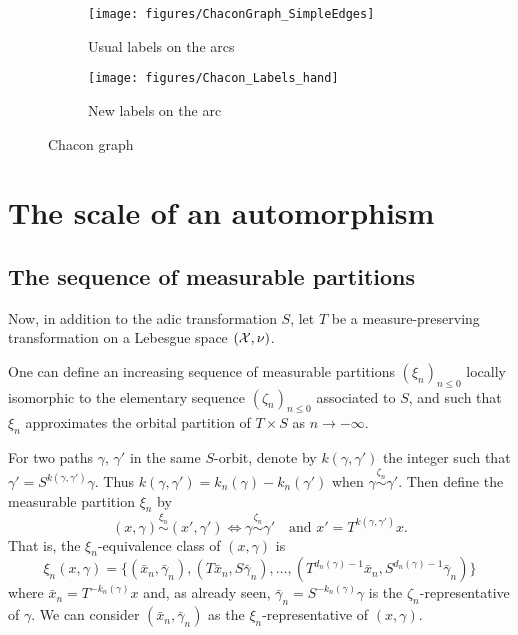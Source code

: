 \documentclass[12pt,a4paper]{article}
\begin{document}
\begin{figure}[!h]
   \centering
   \begin{subfigure}[t]{0.47\textwidth}
   \centering
   	\texttt{[image: figures/ChaconGraph\_SimpleEdges]}
 		\caption{\footnotesize Usual labels on the arcs}\label{fig:ChaconGraph_simpleedges}
    \end{subfigure}              
   \quad
    \begin{subfigure}[t]{0.47\textwidth}
    \centering
   	\texttt{[image: figures/Chacon\_Labels\_hand]}
 		\caption{\footnotesize New labels on the arc}\label{fig:ChaconGraph_newlabs}
 	\end{subfigure}      

   \caption{Chacon graph}
   \label{fig:ChaconGraph}
 \end{figure}



\section{The scale of an automorphism}

\subsection{The sequence of measurable partitions}

Now, in addition to the adic transformation $S$, let $T$ be a measure-preserving transformation on a Lebesgue space $(\mathcal{X}, \nu)$. 

One can define an increasing sequence of measurable partitions ${(\xi_n)}_{n \leq 0}$ 
locally isomorphic to the elementary sequence ${(\zeta_n)}_{n \leq 0}$ associated to $S$,  
and such that $\xi_n$ approximates the orbital partition of $T \times S$ as 
$n \to -\infty$.

For two paths $\gamma$, $\gamma'$ in the same $S$-orbit, denote by $k(\gamma,\gamma')$ 
the integer such that $\gamma'=S^{k(\gamma,\gamma')}\gamma$. 
Thus $k(\gamma,\gamma') = k_n(\gamma)-k_n(\gamma')$ when $\gamma \overset{\zeta_n}{\sim} \gamma'$. 
Then define the measurable partition $\xi_n$ by 
$$
\boxed{(x, \gamma) \overset{\xi_n}{\sim} (x', \gamma') \iff 
\gamma \overset{\zeta_n}{\sim} \gamma' \quad 
\text{and $x'=T^{k(\gamma,\gamma')}x$}}. 
$$
That is, the $\xi_n$-equivalence class of $(x,\gamma)$ is 
$$
\boxed{\xi_n(x,\gamma) = \bigl\{(\bar x_n, \bar\gamma_n), (T\bar x_n, S\bar\gamma_n), 
\ldots, (T^{d_n(\gamma)-1}\bar x_n, S^{d_n(\gamma)-1}\bar\gamma_n) \bigr\}}
$$
where $\bar x_n = T^{-k_n(\gamma)}x$ and, as already seen, 
$\bar\gamma_n = S^{-k_n(\gamma)}\gamma$ is the $\zeta_n$-representative of 
$\gamma$. 
We can consider $(\bar x_n, \bar\gamma_n)$ as the $\xi_n$-representative of
$(x,\gamma)$. 
\end{document}

